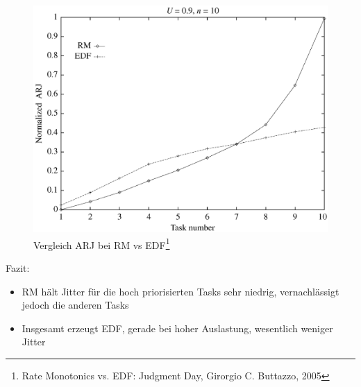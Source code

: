 \begin{frame}{\subsecname}
	\begin{center}
	\begin{figure}
		\includegraphics[scale=.20]{graphics/vergleich/jitter.png}
		\caption{Vergleich ARJ bei RM vs EDF\footnote{Rate Monotonics vs. EDF: Judgment Day, Girorgio C. Buttazzo, 2005}}	
	\end{figure}
	\end{center}
\end{frame}

\begin{frame}{\subsecname}
	Fazit:
	\begin{itemize}
		\item RM hält Jitter für die hoch priorisierten Tasks sehr niedrig, vernachlässigt jedoch die anderen Tasks
		\item Insgesamt erzeugt EDF, gerade bei hoher Auslastung, wesentlich weniger Jitter
	\end{itemize}
\end{frame}

%